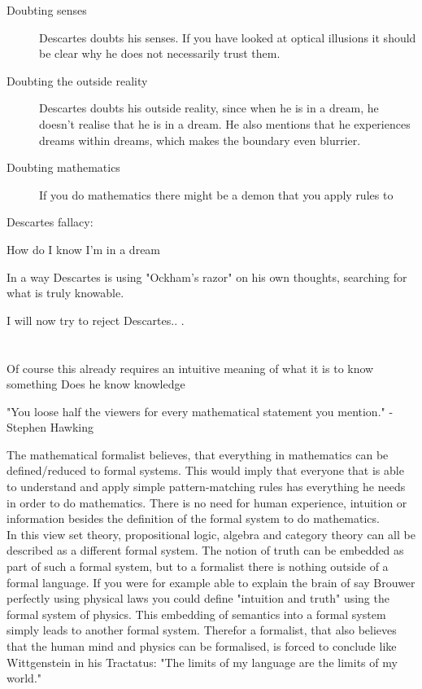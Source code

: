 \begin{description}
	\item[Doubting senses] Descartes doubts his senses. If you have looked at optical illusions it should be clear why he does not necessarily trust them.
	\item[Doubting the outside reality] Descartes doubts his outside reality, since when he is in a dream, he doesn't realise that he is in a dream. He also mentions that he experiences dreams within dreams, which makes the boundary even blurrier.
	\item[Doubting mathematics] If you do mathematics there might be a demon that  you apply rules to   
\end{description}

Descartes fallacy:


How do I know I'm in a dream 

In a way Descartes is using "Ockham's razor" on his own thoughts, searching for what is truly knowable.

I will now try to reject Descartes.. . 

\section{}




Of course this already requires an intuitive meaning of what it is to know something
Does he know knowledge



"You loose half the viewers for every mathematical statement you mention." - Stephen Hawking








The mathematical formalist believes, that everything in mathematics can be defined/reduced to formal systems. This would imply that everyone that is able to understand and apply simple pattern-matching rules has everything he needs in order to do mathematics. There is no need for human experience, intuition or information besides the definition of the formal system to do mathematics. \\

In this view set theory, propositional logic, algebra and category theory can all be described as a different formal system. The notion of truth can be embedded as part of such a formal system, but to a formalist there is nothing outside of a formal language.
If you were for example able to explain the brain of say Brouwer perfectly using physical laws you could define "intuition and truth" using the formal system of physics.
This embedding of semantics into a formal system simply leads to another formal system. Therefor a formalist, that also believes that the human mind and physics can be formalised, is forced to conclude like Wittgenstein in his Tractatus: "The limits of my language are the limits of my world."

